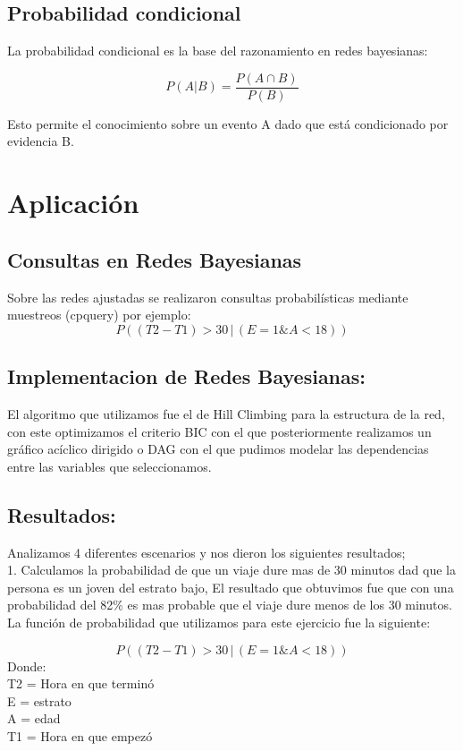 \documentclass{ajceam-class}   %
\begin{document}
\subsection{Probabilidad condicional}
La probabilidad condicional es la base del razonamiento en redes bayesianas: 

\begin{equation}
P(A|B) = \frac{P(A\cap B)}{P(B)}
\label{eq:Prob-C}
\end{equation}

Esto permite el conocimiento sobre un evento A dado que está condicionado por evidencia B.\cite{html_Prob}

\section{Aplicación}
\subsection{Consultas en Redes Bayesianas}
Sobre las redes ajustadas se realizaron consultas probabilísticas mediante muestreos (cpquery) por ejemplo: 
$$P((T2 - T1)>30\, |\, (E=1 \& A<18))$$

\subsection{Implementacion de Redes Bayesianas:}

El algoritmo que utilizamos fue el de Hill Climbing para la estructura de la red, con este optimizamos el criterio BIC con el que posteriormente realizamos un gráfico acíclico dirigido o DAG con el que pudimos modelar las dependencias entre las variables que seleccionamos.

\subsection{Resultados:}

Analizamos 4 diferentes escenarios y nos dieron los siguientes resultados;\\


1.	Calculamos la probabilidad de que un viaje dure mas de 30 minutos dad que la persona es un joven del estrato bajo, El resultado que obtuvimos fue que con una probabilidad del 82\% es mas probable que el viaje dure menos de los 30 minutos. La función de probabilidad que utilizamos para este ejercicio fue la siguiente:

$$P((T2 - T1)>30\, |\, (E=1 \& A<18))$$
Donde:\\
T2 = Hora en que terminó\\
E = estrato\\
A = edad\\
T1 = Hora en que empezó\\
\end{document}
